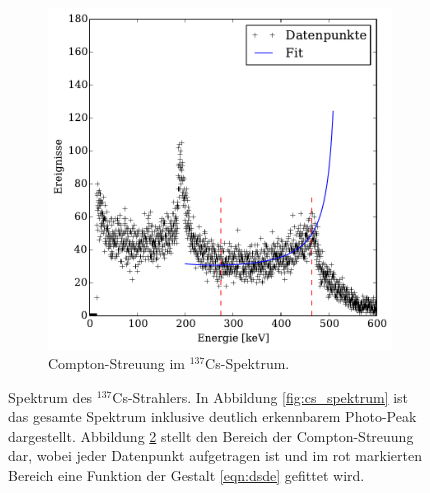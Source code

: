 \begin{figure}[htb]
\begin{subfigure}{0.49\linewidth}
        \includegraphics[width=1.0\linewidth]{img/06_caesium_zoomed.pdf}
        \caption{
            Compton-Streuung im $^{137}$Cs-Spektrum.
        }
        \label{fig:cs_spektrum_zoom}
    \end{subfigure}
    \caption{
        Spektrum des $^{137}$Cs-Strahlers. In Abbildung \ref{fig:cs_spektrum}
        ist das gesamte Spektrum inklusive deutlich erkennbarem Photo-Peak
        dargestellt.
        Abbildung \ref{fig:cs_spektrum_zoom} stellt den Bereich der
        Compton-Streuung dar, wobei jeder Datenpunkt aufgetragen ist und
        im rot markierten Bereich eine Funktion der Gestalt \eqref{eqn:dsde}
        gefittet wird.
    }
\end{figure}

